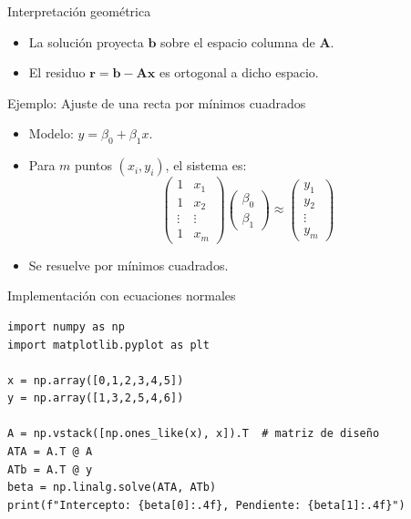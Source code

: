 \documentclass[aspectratio=169, 10pt, xcolor=table]{beamer}
\begin{document}
\begin{frame}{Interpretación geométrica}
    \begin{itemize}
        \item La solución proyecta $\mathbf{b}$ sobre el espacio columna de $\mathbf{A}$.
        \item El residuo $\mathbf{r} = \mathbf{b} - \mathbf{A}\mathbf{x}$ es ortogonal a dicho espacio.
    \end{itemize}
    \centering
\end{frame}

\begin{frame}{Ejemplo: Ajuste de una recta por mínimos cuadrados}
    \begin{itemize}
        \item Modelo: $y = \beta_0 + \beta_1 x$.
        \item Para $m$ puntos $(x_i, y_i)$, el sistema es:
        \[
        \begin{pmatrix} 1 & x_1 \\ 1 & x_2 \\ \vdots & \vdots \\ 1 & x_m \end{pmatrix}
        \begin{pmatrix} \beta_0 \\ \beta_1 \end{pmatrix}
        \approx \begin{pmatrix} y_1 \\ y_2 \\ \vdots \\ y_m \end{pmatrix}
        \]
        \item Se resuelve por mínimos cuadrados.
    \end{itemize}
\end{frame}

\begin{frame}[fragile]{Implementación con ecuaciones normales}
    \begin{lstlisting}
import numpy as np
import matplotlib.pyplot as plt

x = np.array([0,1,2,3,4,5])
y = np.array([1,3,2,5,4,6])

A = np.vstack([np.ones_like(x), x]).T  # matriz de diseño
ATA = A.T @ A
ATb = A.T @ y
beta = np.linalg.solve(ATA, ATb)
print(f"Intercepto: {beta[0]:.4f}, Pendiente: {beta[1]:.4f}")
    \end{lstlisting}
\end{frame}
\end{document}
